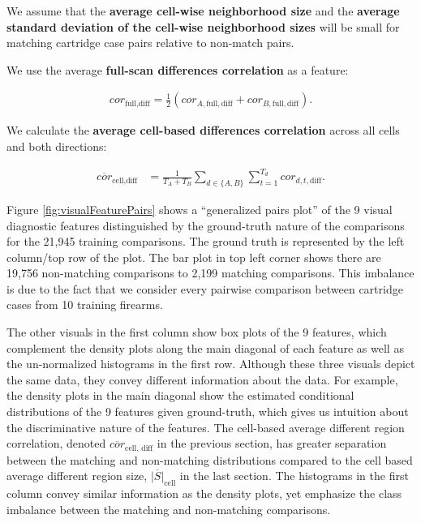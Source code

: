 \documentclass[11pt,]{isuthesis}
\begin{document}
We assume that the \textbf{average cell-wise neighborhood size} and the \textbf{average standard deviation of the cell-wise neighborhood sizes} will be small for matching cartridge case pairs relative to non-match pairs.

We use the average \textbf{full-scan differences correlation} as a feature:

\begin{align*}
cor_{\text{full},\text{diff}} = \frac{1}{2}\left(cor_{A,\text{full},\text{diff}} + cor_{B,\text{full},\text{diff}}\right).
\end{align*}

We calculate the \textbf{average cell-based differences correlation} across all cells and both directions:

\begin{align*}
\overline{cor}_{\text{cell},\text{diff}} &= \frac{1}{T_A + T_B} \sum_{d \in \{A,B\}} \sum_{t=1}^{T_d} cor_{d,t,\text{diff}}.
\end{align*}

Figure \ref{fig:visualFeaturePairs} shows a ``generalized pairs plot'' \citep{gpp, ggally} of the 9 visual diagnostic features distinguished by the ground-truth nature of the comparisons for the 21,945 training comparisons.
The ground truth is represented by the left column/top row of the plot.
The bar plot in top left corner shows there are 19,756 non-matching comparisons to 2,199 matching comparisons.
This imbalance is due to the fact that we consider every pairwise comparison between cartridge cases from 10 training firearms.

The other visuals in the first column show box plots of the 9 features, which complement the density plots along the main diagonal of each feature as well as the un-normalized histograms in the first row.
Although these three visuals depict the same data, they convey different information about the data.
For example, the density plots in the main diagonal show the estimated conditional distributions of the 9 features given ground-truth, which gives us intuition about the discriminative nature of the features.
The cell-based average different region correlation, denoted \(\overline{cor}_{\text{cell, diff}}\) in the previous section, has greater separation between the matching and non-matching distributions compared to the cell based average different region size, \(\overline{|S|}_{\text{cell}}\) in the last section.
The histograms in the first column convey similar information as the density plots, yet emphasize the class imbalance between the matching and non-matching comparisons.
\end{document}
